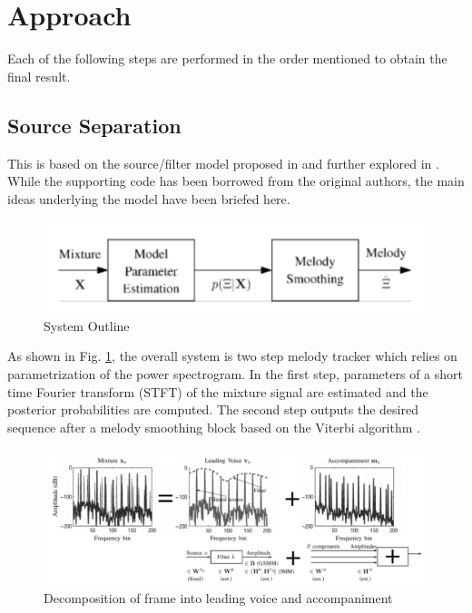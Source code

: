 \documentclass[12pt,journal,compsoc]{IEEEtran}
\begin{document}
\section{Approach}

Each of the following steps are performed in the order mentioned to obtain the final result.

\subsection{Source Separation}

This is based on the source/filter model proposed in \cite{durrieu01} and further explored in \cite{durrieu02}. While the supporting code has been borrowed from the original authors, the main ideas underlying the model have been briefed here.

\begin{figure}[H]
\includegraphics[scale=0.2]{images/fig1}
    \caption{System Outline}
    \label{fig:fig1}
\end{figure}

As shown in Fig. \ref{fig:fig1}, the overall system is two step melody tracker which relies on parametrization of the power spectrogram. In the first step, parameters of a short time Fourier transform (STFT) of the mixture signal are estimated and the posterior probabilities are computed. The second step outputs the desired sequence after a melody smoothing block based on the Viterbi algorithm \cite{viterbi}.

\begin{figure}[H]
\includegraphics[scale=0.12]{images/fig2}
    \caption{Decomposition of frame into leading voice and accompaniment}
    \label{fig:fig2}
\end{figure}
\end{document}
